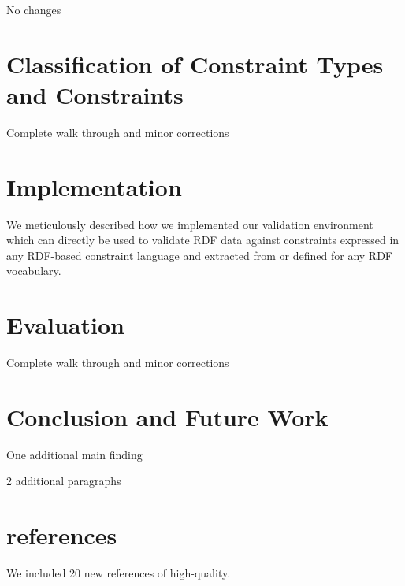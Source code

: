 \documentclass{ws-ijsc}
\begin{document}
\begin{itemlist}
 \item No changes
\end{itemlist}

\section{Classification of Constraint Types and Constraints}	

\begin{itemlist}
 \item Complete walk through and minor corrections
\end{itemlist}

\section{Implementation}

\begin{itemlist}
 \item We meticulously described how we implemented our validation environment which can directly be used to validate RDF data against constraints expressed in any RDF-based constraint language and extracted from or defined for any RDF vocabulary. 
\end{itemlist}

\section{Evaluation}

\begin{itemlist}
 \item Complete walk through and minor corrections
\end{itemlist}

\section{Conclusion and Future Work}

\begin{itemlist}
 \item One additional main finding
 \item 2 additional paragraphs
\end{itemlist}

\section{references}

\begin{itemlist}
 \item We included 20 new references of high-quality.
\end{itemlist}
\end{document}
